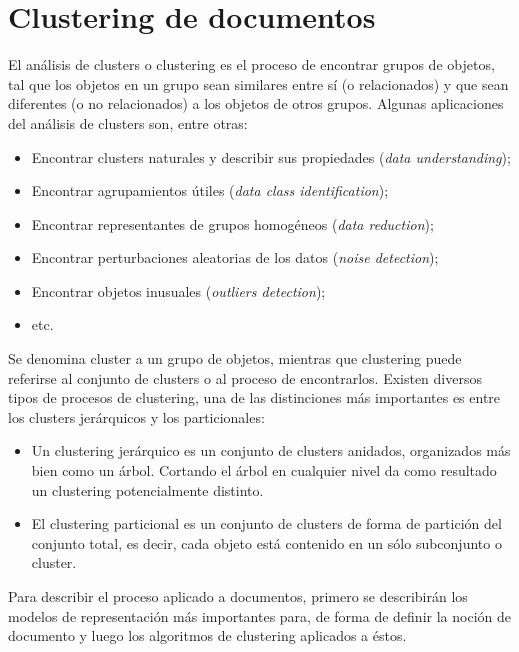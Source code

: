 \documentclass[upright, contnum]{umemoria}
\begin{document}
   

   
   
   

\section{Clustering de documentos}
\label{sec-2.2}


   El análisis de clusters o clustering es el proceso de encontrar
   grupos de objetos, tal que los objetos en un grupo sean similares
   entre sí (o relacionados) y que sean diferentes (o no relacionados)
   a los objetos de otros grupos. Algunas aplicaciones del análisis de
   clusters son, entre otras:
\begin{itemize}
\item Encontrar clusters naturales y describir sus propiedades (\emph{data understanding});
\item Encontrar agrupamientos útiles (\emph{data class identification});
\item Encontrar representantes de grupos homogéneos (\emph{data reduction});
\item Encontrar perturbaciones aleatorias de los datos (\emph{noise detection});
\item Encontrar objetos inusuales (\emph{outliers detection});
\item etc.
\end{itemize}
   Se denomina cluster a un grupo de objetos, mientras que
   clustering puede referirse al conjunto de clusters o al proceso de
   encontrarlos. Existen diversos tipos de procesos de clustering, una
   de las distinciones más importantes es entre los clusters
   jerárquicos y los particionales:
\begin{itemize}
\item Un clustering jerárquico es un conjunto de clusters anidados,
     organizados más bien como un árbol. Cortando el árbol en
     cualquier nivel da como resultado un clustering potencialmente
     distinto.
\item El clustering particional es un conjunto de clusters de forma de
     partición del conjunto total, es decir, cada objeto está
     contenido en un sólo subconjunto o cluster.
\end{itemize}
   Para describir el proceso aplicado a documentos, primero se
   describirán los modelos de representación más importantes para,
   de forma de definir la noción de documento y luego los
   algoritmos de clustering aplicados a éstos.
\end{document}
